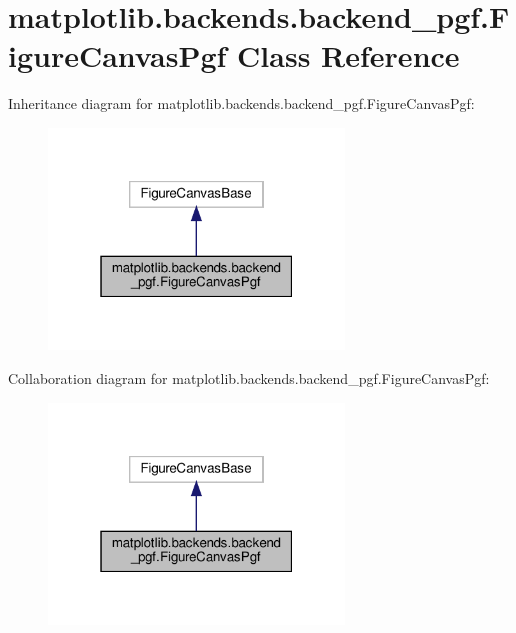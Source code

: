 \hypertarget{classmatplotlib_1_1backends_1_1backend__pgf_1_1FigureCanvasPgf}{}\section{matplotlib.\+backends.\+backend\+\_\+pgf.\+Figure\+Canvas\+Pgf Class Reference}
\label{classmatplotlib_1_1backends_1_1backend__pgf_1_1FigureCanvasPgf}


Inheritance diagram for matplotlib.\+backends.\+backend\+\_\+pgf.\+Figure\+Canvas\+Pgf\+:
\nopagebreak
\begin{figure}[H]
\begin{center}
\leavevmode
\includegraphics[width=223pt]{classmatplotlib_1_1backends_1_1backend__pgf_1_1FigureCanvasPgf__inherit__graph}
\end{center}
\end{figure}


Collaboration diagram for matplotlib.\+backends.\+backend\+\_\+pgf.\+Figure\+Canvas\+Pgf\+:
\nopagebreak
\begin{figure}[H]
\begin{center}
\leavevmode
\includegraphics[width=223pt]{classmatplotlib_1_1backends_1_1backend__pgf_1_1FigureCanvasPgf__coll__graph}
\end{center}
\end{figure}
